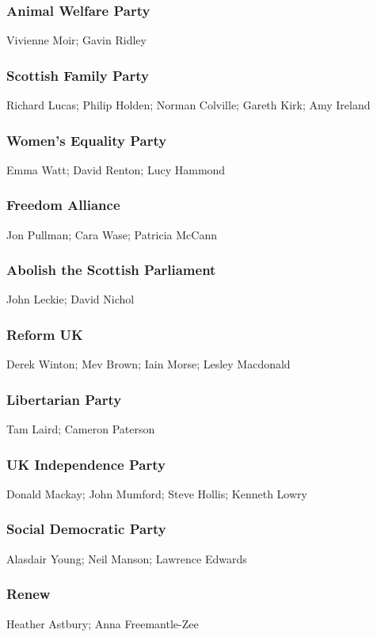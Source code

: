 \begin{resultsiii}
	\subsubsection*{Animal Welfare Party}
	Vivienne Moir; Gavin Ridley
	
	\subsubsection*{Scottish Family Party}
	Richard Lucas; Philip Holden; Norman Colville; Gareth Kirk; Amy Ireland
	
	\subsubsection*{Women's Equality Party}
	Emma Watt; David Renton; Lucy Hammond
	
	\subsubsection*{Freedom Alliance}
	Jon Pullman; Cara Wase; Patricia McCann
	
	\subsubsection*{Abolish the Scottish Parliament}
	John Leckie; David Nichol
	
	\subsubsection*{Reform UK}
	Derek Winton; Mev Brown; Iain Morse; Lesley Macdonald
	
	\subsubsection*{Libertarian Party}
	Tam Laird; Cameron Paterson
	
	\subsubsection*{UK Independence Party}
	Donald Mackay; John Mumford; Steve Hollis; Kenneth Lowry
	
	\subsubsection*{Social Democratic Party}
	Alasdair Young; Neil Manson; Lawrence Edwards
	
	\subsubsection*{Renew}
	Heather Astbury; Anna Freemantle-Zee
\end{resultsiii}

